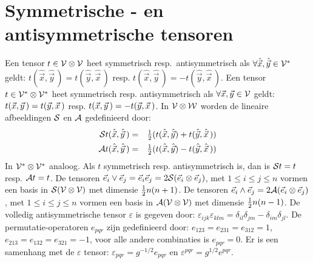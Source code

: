 \documentclass[twoside]{report}
\begin{document}
\section{Symmetrische - en antisymmetrische tensoren}
Een tensor $t\in{\cal V\otimes V}$ heet symmetrisch resp.\ antisymmetrisch als
$\forall\hat{\vec{x}},\hat{\vec{y}}\in{\cal V^*}$ geldt:
$t(\hat{\vec{x}},\hat{\vec{y}}\,)=t(\hat{\vec{y}},\hat{\vec{x}}\,)$ resp.
$t(\hat{\vec{x}},\hat{\vec{y}}\,)=-t(\hat{\vec{y}},\hat{\vec{x}}\,)$.
\npar
Een tensor $t\in{\cal V^*\otimes V^*}$ heet symmetrisch resp. antisymmetrisch
als $\forall\vec{x},\vec{y}\in{\cal V}$ geldt:
$t(\vec{x},\vec{y}\,)=t(\vec{y},\vec{x}\,)$ resp.
$t(\vec{x},\vec{y}\,)=-t(\vec{y},\vec{x}\,)$. In $\cal V\otimes W$ worden de
lineaire afbeeldingen $\cal S$ en $\cal A$ gedefinieerd door:
\begin{eqnarray*}
{\cal S}t(\hat{\vec{x}},\hat{\vec{y}}\,)&=&\mbox{$\frac{1}{2}$}(t(\hat{\vec{x}},\hat{\vec{y}})+t(\hat{\vec{y}},\hat{\vec{x}}\,))\\
{\cal A}t(\hat{\vec{x}},\hat{\vec{y}}\,)&=&\mbox{$\frac{1}{2}$}(t(\hat{\vec{x}},\hat{\vec{y}})-t(\hat{\vec{y}},\hat{\vec{x}}\,))
\end{eqnarray*}
In $\cal V^*\otimes V^*$ analoog. Als $t$ symmetrisch resp. antisymmetrisch is,
dan is ${\cal S}t=t$ resp. ${\cal A}t=t$.
\npar
De tensoren $\vec{e}_i\vee\vec{e}_j=\vec{e}_i\vec{e}_j=2{\cal S}(\vec{e}_i\otimes\vec{e}_j)$,
met $1\leq i\leq j\leq n$ vormen een basis in $\cal S(V\otimes V)$ met dimensie
$\mbox{$\frac{1}{2}$} n(n+1)$.
\npar
De tensoren $\vec{e}_i\wedge\vec{e}_j=2{\cal A}(\vec{e}_i\otimes\vec{e}_j)$,
met $1\leq i\leq j\leq n$ vormen een basis in $\cal A(V\otimes V)$ met dimensie
$\mbox{$\frac{1}{2}$} n(n-1)$.
\npar
De volledig antisymmetrische tensor $\varepsilon$ is gegeven door:
$\varepsilon_{ijk}\varepsilon_{klm}=\delta_{il}\delta_{jm}-\delta_{im}\delta_{jl}$.
\npar
De permutatie-operatoren $e_{pqr}$ zijn gedefinieerd door:
$e_{123}=e_{231}=e_{312}=1$, $e_{213}=e_{132}=e_{321}=-1$, voor alle andere
combinaties is $e_{pqr}=0$. Er is een samenhang met de $\varepsilon$ tensor:
$\varepsilon_{pqr}=g^{-1/2}e_{pqr}$ en $\varepsilon^{pqr}=g^{1/2}e^{pqr}$.
\end{document}
